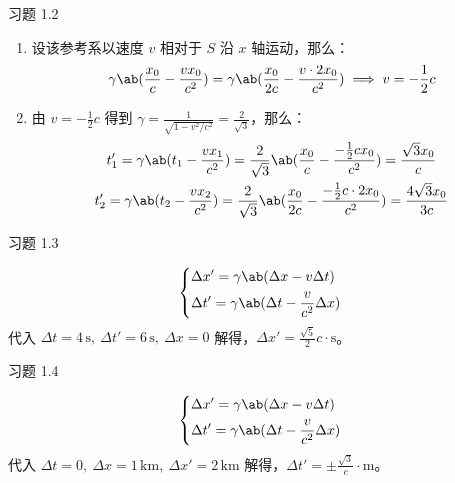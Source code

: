 \begin{problem}
    习题 1.2
    \begin{solution}
        \begin{enumerate}
            \item[\textbf{1)}] 设该参考系以速度 $v$ 相对于 $S$ 沿 $x$ 轴运动，那么：
            $$
            \gamma \ab(\frac{x_0}{c} - \frac{v x_0}{c^2}) = \gamma \ab(\frac{x_0}{2c} - \frac{v \cdot 2x_0}{c^2}) \implies v = -\frac{1}{2}c
            $$
            \item[\textbf{2)}] 由 $v = -\frac{1}{2} c$ 得到 $\gamma = \frac{1}{\sqrt{1 - v^2 / c^2}} = \frac{2}{\sqrt{3}}$，那么：
            $$
            \begin{gathered}
                t_1' = \gamma \ab(t_1 - \frac{v x_1}{c^2}) = \frac{2}{\sqrt{3}} \ab(\frac{x_0}{c} - \frac{-\frac{1}{2} c x_0}{c^2}) = \frac{\sqrt{3} x_0}{c} \\
                t_2' = \gamma \ab(t_2 - \frac{v x_2}{c^2}) = \frac{2}{\sqrt{3}} \ab(\frac{x_0}{2c} - \frac{-\frac{1}{2} c \cdot 2x_0}{c^2}) = \frac{4 \sqrt{3} x_0}{3 c}
            \end{gathered}
            $$
        \end{enumerate}
    \end{solution}
\end{problem}

\begin{problem}
    习题 1.3
    \begin{solution}
        $$
        \begin{dcases}
            \Delta x' = \gamma \ab(\Delta x - v \Delta t) \\
            \Delta t' = \gamma \ab(\Delta t - \frac{v}{c^2} \Delta x)
        \end{dcases}
        $$
        代入 $\Delta t = 4\,\mathrm{s},\ \Delta t' = 6\,\mathrm{s},\ \Delta x = 0$ 解得，$\Delta x' = \frac{\sqrt{5}}{2} c \cdot \mathrm{s}$。
    \end{solution}
\end{problem}

\begin{problem}
    习题 1.4
    \begin{solution}
        $$
        \begin{dcases}
            \Delta x' = \gamma \ab(\Delta x - v \Delta t) \\
            \Delta t' = \gamma \ab(\Delta t - \frac{v}{c^2} \Delta x)
        \end{dcases}
        $$
        代入 $\Delta t = 0,\ \Delta x = 1\,\mathrm{km},\ \Delta x' = 2\,\mathrm{km}$ 解得，$\Delta t' = \pm \frac{\sqrt{3}}{c} \cdot \mathrm{m}$。
    \end{solution}
\end{problem}

